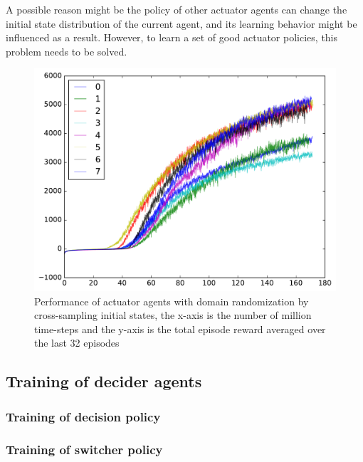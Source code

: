 A possible reason might be the policy of other actuator agents can change the initial state distribution of the current agent, and its learning behavior might be influenced as a result. However, to learn a set of good actuator policies, this problem needs to be solved.
\begin{figure}[!htbp]
	\includegraphics[width=\textwidth]{images/rec_8task_training.pdf}
	\centering
	\caption{Performance of actuator agents with domain randomization by cross-sampling initial states, the x-axis is the number of million time-steps and the y-axis is the total episode reward averaged over the last 32 episodes}\label{rec_8task_training}
\end{figure}

\subsection{Training of decider agents}
\subsubsection{Training of decision policy}
\subsubsection{Training of switcher policy}